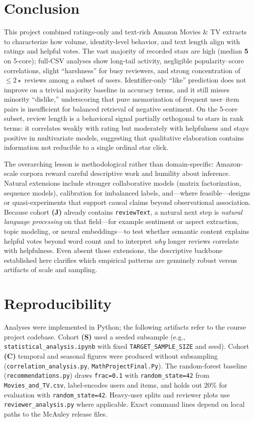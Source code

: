 \documentclass[conference]{IEEEtran}
\begin{document}
\section{Conclusion}
This project combined ratings-only and text-rich Amazon Movies \& TV extracts to characterize how volume, identity-level behavior, and text length align with ratings and helpful votes. The vast majority of recorded stars are high (median \textbf{5} on 5-core); full-CSV analyses show long-tail activity, negligible popularity--score correlations, slight ``harshness'' for busy reviewers, and strong concentration of $\leq 2\star$ reviews among a subset of users. Identifier-only ``like'' prediction does not improve on a trivial majority baseline in accuracy terms, and it still misses minority ``dislike,'' underscoring that pure memorization of frequent user--item pairs is insufficient for balanced retrieval of negative sentiment. On the 5-core subset, review length is a behavioral signal partially orthogonal to stars in rank terms: it correlates weakly with rating but moderately with helpfulness and stays positive in multivariate models, suggesting that qualitative elaboration contains information not reducible to a single ordinal star click.

The overarching lesson is methodological rather than domain-specific: Amazon-scale corpora reward careful descriptive work and humility about inference. Natural extensions include stronger collaborative models (matrix factorization, sequence models), calibration for imbalanced labels, and---where feasible---designs or quasi-experiments that support causal claims beyond observational association. Because cohort \textbf{(J)} already contains \texttt{reviewText}, a natural next step is \emph{natural language processing} on that field---for example sentiment or aspect extraction, topic modeling, or neural embeddings---to test whether semantic content explains helpful votes beyond word count and to interpret \emph{why} longer reviews correlate with helpfulness. Even absent those extensions, the descriptive backbone established here clarifies which empirical patterns are genuinely robust versus artifacts of scale and sampling.

\appendices
\section{Reproducibility}
\label{app:repro}

Analyses were implemented in Python; the following artifacts refer to the course project codebase. Cohort \textbf{(S)} used a seeded subsample (e.g., \texttt{statistical\_analysis.ipynb} with fixed \texttt{TARGET\_SAMPLE\_SIZE} and seed). Cohort \textbf{(C)} temporal and seasonal figures were produced without subsampling (\texttt{correlation\_analysis.py}, \texttt{MathProjectFinal.Py}). The random-forest baseline (\texttt{recommendations.py}) draws \texttt{frac=0.1} with \texttt{random\_state=42} from \texttt{Movies\_and\_TV.csv}, label-encodes users and items, and holds out 20\% for evaluation with \texttt{random\_state=42}. Heavy-user splits and reviewer plots use \texttt{reviewer\_analysis.py} where applicable. Exact command lines depend on local paths to the McAuley release files.
\end{document}
